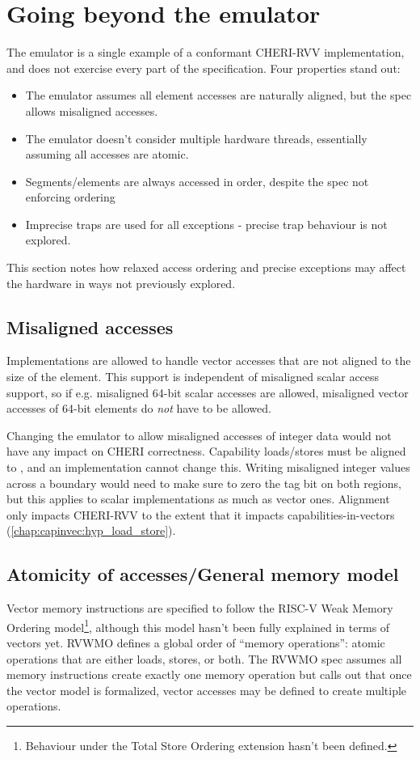 \section{Going beyond the emulator}
The emulator is a single example of a conformant CHERI-RVV implementation, and does not exercise every part of the specification.
Four properties stand out:
\begin{itemize}
    \item The emulator assumes all element accesses are naturally aligned, but the spec allows misaligned accesses.
    \item The emulator doesn't consider multiple hardware threads, essentially assuming all accesses are atomic.
    \item Segments/elements are always accessed in order, despite the spec not enforcing ordering
    \item Imprecise traps are used for all exceptions - precise trap behaviour is not explored.
\end{itemize}
This section notes how relaxed access ordering and precise exceptions may affect the hardware in ways not previously explored.

\subsection{Misaligned accesses}
Implementations are allowed to handle vector accesses that are not aligned to the size of the element.
This support is independent of misaligned scalar access support, so if e.g. misaligned 64-bit scalar accesses are allowed, misaligned vector accesses of 64-bit elements do \emph{not} have to be allowed.

Changing the emulator to allow misaligned accesses of integer data would not have any impact on CHERI correctness.
Capability loads/stores must be aligned to \cite[Section 3.5.2]{TR-951}, and an implementation cannot change this.
Writing misaligned integer values across a  boundary would need to make sure to zero the tag bit on both regions, but this applies to scalar implementations as much as vector ones.
Alignment only impacts CHERI-RVV to the extent that it impacts capabilities-in-vectors (\cref{chap:capinvec:hyp_load_store}).

\subsection{Atomicity of accesses/General memory model}
Vector memory instructions are specified to follow the RISC-V Weak Memory Ordering model\cite{specification-RVV-v1.0}\footnote{Behaviour under the Total Store Ordering extension hasn't been defined.}, although this model hasn't been fully explained in terms of vectors yet.
RVWMO defines a global order of \enquote{memory operations}: atomic operations that are either loads, stores, or both\cite[Chapter 14]{specification-RISCV-vol1-20191213}.
The RVWMO spec assumes all memory instructions create exactly one memory operation but calls out that once the vector model is formalized, vector accesses may be defined to create multiple operations.

